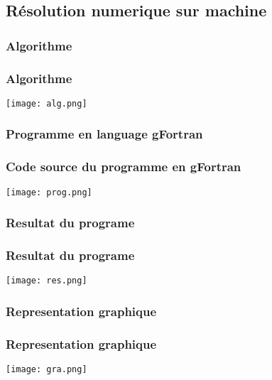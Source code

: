 \documentclass[11pt]{beamer}
\begin{document}
\begin{frame}
\subsection{Résolution numerique sur machine}
\subsubsection{Algorithme}
\frametitle{Algorithme}
\texttt{[image: alg.png]}
\end{frame}
\begin{frame}
\subsubsection{Programme en language gFortran}
\frametitle{Code source du programme en gFortran}
\begin{block}


\texttt{[image: prog.png]}
\end{block}


\end{frame}

\begin{frame}
\subsubsection{Resultat du programe}
\frametitle{Resultat du programe}
\texttt{[image: res.png]}

\end{frame}
\begin{frame}
\subsubsection{Representation graphique}
\frametitle{Representation graphique}
\texttt{[image: gra.png]}
\end{frame}
\end{document}
